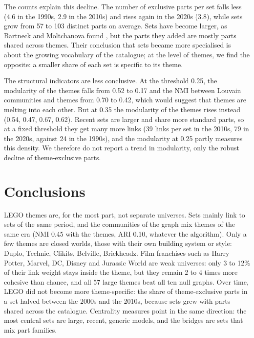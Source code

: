 \documentclass[10pt,a4paper]{article}
\begin{document}
The counts explain this decline. The number of exclusive parts per set falls
less (4.6 in the 1990s, 2.9 in the 2010s) and rises again in the 2020s (3.8),
while sets grow from 57 to 103 distinct parts on average. Sets have become
larger, as Bartneck and Moltchanova found \cite{bartneck2018}, but the parts
they added are mostly parts shared across themes. Their conclusion that sets
became more specialised is about the growing vocabulary of the catalogue; at
the level of themes, we find the opposite: a smaller share of each set is
specific to its theme.

The structural indicators are less conclusive. At the threshold 0.25, the
modularity of the themes falls from 0.52 to 0.17 and the NMI between Louvain
communities and themes from 0.70 to 0.42, which would suggest that themes are
melting into each other. But at 0.35 the modularity of the themes rises
instead (0.54, 0.47, 0.67, 0.62). Recent sets are larger and share more
standard parts, so at a fixed threshold they get many more links (39 links per
set in the 2010s, 79 in the 2020s, against 24 in the 1990s), and the
modularity at 0.25 partly measures this density. We therefore do not report a
trend in modularity, only the robust decline of theme-exclusive parts.

\section{Conclusions}
\label{sec:conclusion}

LEGO themes are, for the most part, not separate universes. Sets mainly link
to sets of the same period, and the communities of the graph mix themes of the
same era (NMI 0.45 with the themes, ARI 0.10, whatever the algorithm). Only a
few themes are closed worlds, those with their own building system or style:
Duplo, Technic, Clikits, Belville, Brickheadz. Film franchises such as Harry
Potter, Marvel, DC, Disney and Jurassic World are weak universes: only 3 to
12\% of their link weight stays inside the theme, but they remain 2 to 4 times
more cohesive than chance, and all 57 large themes beat all ten null graphs. Over time, LEGO did not become more theme-specific:
the share of theme-exclusive parts in a set halved between the 2000s and the
2010s, because sets grew with parts shared across the catalogue. Centrality
measures point in the same direction: the most central sets are large, recent,
generic models, and the bridges are sets that mix part families.
\end{document}
